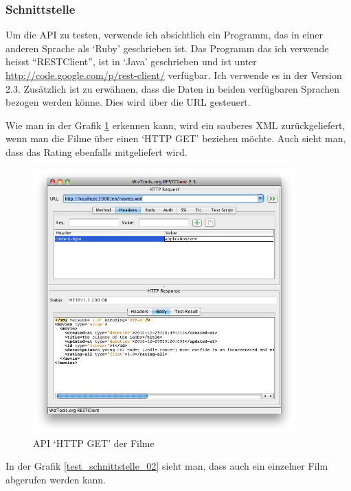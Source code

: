 \clearpage

\subsubsection{Schnittstelle}
Um die API zu testen, verwende ich absichtlich ein Programm, das in einer
anderen Sprache als `Ruby' geschrieben ist. Das Programm das ich verwende
heisst ``RESTClient'', ist in `Java' geschrieben und ist unter 
\url{http://code.google.com/p/rest-client/} verfügbar. Ich verwende es in der 
Version 2.3. Zusätzlich ist zu erwähnen, dass die Daten in beiden verfügbaren
Sprachen bezogen werden könne. Dies wird über die URL gesteuert. 

Wie man in der Grafik \ref{test_schnittstelle_01} erkennen kann, wird ein
sauberes XML zurückgeliefert, wenn man die Filme über einen `HTTP GET' beziehen 
möchte. Auch sieht man, dass das Rating ebenfalls mitgeliefert wird.

\begin{figure}[ht]
    \begin{center}
        \includegraphics[width=0.9\textwidth,angle=0]{./bilder/tests/test_schnittstelle_01.png}
        \caption{API `HTTP GET' der Filme}
        \label{test_schnittstelle_01}
    \end{center}
\end{figure}

In der Grafik \ref{test_schnittstelle_02} sieht man, dass auch ein einzelner
Film abgerufen werden kann.

